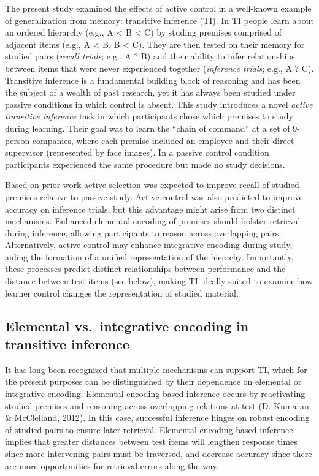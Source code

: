 \documentclass[floatsintext,man]{apa6}
\theoremstyle{definition}
\theoremstyle{definition}
\theoremstyle{definition}
\theoremstyle{remark}
\begin{document}
The present study examined the effects of active control in a well-known
example of generalization from memory: transitive inference (TI). In TI
people learn about an ordered hierarchy (e.g., A \textless{} B
\textless{} C) by studing premises comprised of adjacent items (e.g., A
\textless{} B, B \textless{} C). They are then tested on their memory
for studied pairs (\emph{recall trials}; e.g., A ? B) and their ability
to infer relationships between items that were never experienced
together (\emph{inference trials}; e.g., A ? C). Transitive inference is
a fundamental building block of reasoning and has been the subject of a
wealth of past research, yet it has always been studied under passive
conditions in which control is absent. This study introduces a novel
\emph{active transitive inference} task in which participants chose
which premises to study during learning. Their goal was to learn the
\enquote{chain of command} at a set of 9-person companies, where each
premise included an employee and their direct supervisor (represented by
face images). In a passive control condition participants experienced
the same procedure but made no study decisions.

Based on prior work active selection was expected to improve recall of
studied premises relative to passive study. Active control was also
predicted to improve accuracy on inference trials, but this advantage
might arise from two distinct mechanisms. Enhanced elemental encoding of
premises should bolster retrieval during inference, allowing
participants to reason across overlapping pairs. Alternatively, active
control may enhance integrative encoding during study, aiding the
formation of a unified representation of the hierachy. Importantly,
these processes predict distinct relationships between performance and
the distance between test items (see below), making TI ideally suited to
examine how learner control changes the representation of studied
material.

\subsection{Elemental vs.~integrative encoding in transitive
inference}\label{elemental-vs.integrative-encoding-in-transitive-inference}

It has long been recognized that multiple mechanisms can support TI,
which for the present purposes can be distinguished by their dependence
on elemental or integrative encoding. Elemental encoding-based inference
occurs by reactivating studied premises and reasoning across overlapping
relations at test (D. Kumaran \& McClelland, 2012). In this case,
successful inference hinges on robust encoding of studied pairs to
ensure later retrieval. Elemental encoding-based inference implies that
greater distances between test items will lengthen response times since
more intervening pairs must be traversed, and decrease accuracy since
there are more opportunities for retrieval errors along the way.
\end{document}
